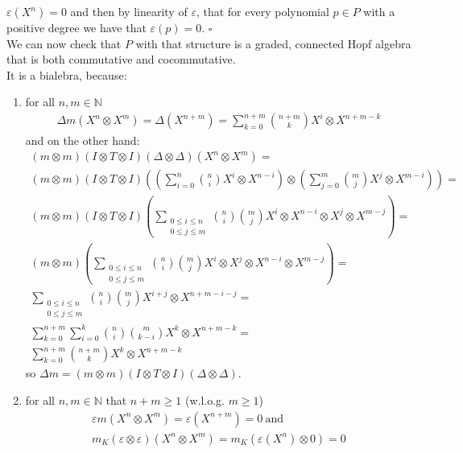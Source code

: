 \documentclass[a4paper, 12pt]{article}
\begin{document}
$\varepsilon(X^n) = 0$ and then by linearity of $\varepsilon$, that for every polynomial $p \in P$ with a
positive degree we have that $\varepsilon(p) = 0$. $\square$\\
We can now check that $P$ with that structure is a graded, connected Hopf algebra that is both commutative
and cocommutative. \\
It is a bialebra, because:
\begin{enumerate}
\item for all $n, m \in \mathbb{N}$
\begin{align*}
\Delta m(X^n \otimes X^m) = \Delta(X^{n+m}) = \sum_{k=0}^{n+m}\binom{n+m}{k}X^i \otimes X^{n+m - k}
\end{align*}
and on the other hand:
\begin{gather*}
    (m\otimes m)(I \otimes T \otimes I)(\Delta \otimes \Delta) (X^n \otimes X^m) = \\
    (m \otimes m)(I \otimes T \otimes I)\left(\left(\sum_{i=0}^n\binom{n}{i}X^i \otimes X^{n-i}\right)
    \otimes\left(\sum_{j=0}^m\binom{m}{j}X^j \otimes X^{m-i}\right)\right) = \\
    (m \otimes m)(I \otimes T \otimes I)\left(\sum_{\substack{0\leq i \leq n \\ 0 \leq j \leq m}}
    \binom{n}{i}\binom{m}{j}X^i\otimes X^{n-i} \otimes X^j \otimes X^{m-j}\right) = \\
    (m \otimes m)\left(\sum_{\substack{0 \leq i \leq n \\ 0 \leq j \leq m}}
    \binom{n}{i}\binom{m}{j}X^i \otimes X^j \otimes X^{n-i} \otimes X^{m-j}\right) = \\
    \sum_{\substack{0 \leq i \leq n \\ 0 \leq j \leq m}}\binom{n}{i}\binom{m}{j}X^{i+j}\otimes X^{n+m-i-j}
    = \\
    \sum_{k=0}^{n+m}\sum_{i=0}^k \binom{n}{i}\binom{m}{k-i}X^k\otimes X^{n+m-k} = \\
    \sum_{k=0}^{n+m}\binom{n+m}{k}X^k\otimes X^{n+m-k}
\end{gather*}
so $\Delta m = (m \otimes m)(I \otimes T \otimes I)(\Delta \otimes \Delta)$.
\item for all $n, m \in \mathbb{N}$ that $n + m \geq 1$ (w.l.o.g. $m \geq 1$)
\begin{gather*}
    \varepsilon m(X^n \otimes X^m) = \varepsilon (X^{n+m}) = 0 \mathrm{\ and}\\
    m_K(\varepsilon \otimes \varepsilon)(X^n \otimes X^m) = m_K(\varepsilon(X^n)\otimes 0) = 0
\end{gather*}

\end{enumerate}
\end{document}
